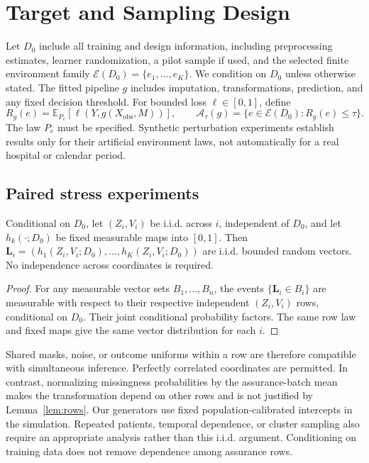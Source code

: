 \documentclass[twoside,11pt]{article}
\newcommand{\A}{\mathcal A}
\newcommand{\E}{\mathcal E}
\newcommand{\Ee}{\mathbb E}
\begin{document}
\section{Target and Sampling Design}
\label{sec:target}
Let $D_0$ include all training and design information, including preprocessing estimates,
learner randomization, a pilot sample if used, and the selected finite environment family
$\E(D_0)=\{e_1,\ldots,e_K\}$. We condition on $D_0$ unless otherwise stated. The fitted
pipeline $g$ includes imputation, transformations, prediction, and any fixed decision threshold.
For bounded loss $\ell\in[0,1]$, define
\begin{equation}
R_g(e)=\Ee_{P_e}[\ell(Y,g(X_{\mathrm{obs}},M))],\qquad
\A_\tau(g)=\{e\in\E(D_0):R_g(e)\leq\tau\}.
\label{eq:target}
\end{equation}
The law $P_e$ must be specified. Synthetic perturbation experiments establish results only
for their artificial environment laws, not automatically for a real hospital or calendar period.

\subsection{Paired stress experiments}
\begin{lemma}
\label{lem:rows}
Conditional on $D_0$, let $(Z_i,V_i)$ be i.i.d. across $i$, independent of $D_0$, and let
$h_k(\cdot;D_0)$ be fixed measurable maps into $[0,1]$. Then
$\mathbf L_i=(h_1(Z_i,V_i;D_0),\ldots,h_K(Z_i,V_i;D_0))$ are i.i.d. bounded random vectors.
No independence across coordinates is required.
\end{lemma}
\begin{proof}
For any measurable vector sets $B_1,\ldots,B_n$, the events
$\{\mathbf L_i\in B_i\}$ are measurable with respect to their respective independent
$(Z_i,V_i)$ rows, conditional on $D_0$. Their joint conditional probability factors. The
same row law and fixed maps give the same vector distribution for each $i$.
\end{proof}

Shared masks, noise, or outcome uniforms within a row are therefore compatible with
simultaneous inference. Perfectly correlated coordinates are permitted. In contrast,
normalizing missingness probabilities by the assurance-batch mean makes the transformation
depend on other rows and is not justified by Lemma~\ref{lem:rows}. Our generators
use fixed population-calibrated intercepts in the simulation. Repeated patients, temporal
dependence, or cluster sampling also require an appropriate analysis rather than this i.i.d.
argument. Conditioning on training data does not remove dependence among assurance rows.
\end{document}
